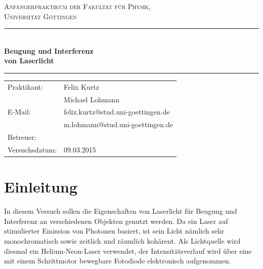 \documentclass[12pt,a4paper,titlepage,headinclude,bibtotoc]{scrartcl}
\begin{document}
\begin{titlepage}
\centering
\textsc{\Large Anfängerpraktikum der Fakultät für
  Physik,\\[1.5ex] Universität Göttingen}

\vspace*{4.2cm}

\rule{\textwidth}{1pt}\\[0.5cm]
{\huge \bfseries
  Beugung und Interferenz\\[1.5ex]
  von Laserlicht}\\[0.5cm]
\rule{\textwidth}{1pt}

\vspace*{3.0cm}

\begin{Large}
\begin{tabular}{ll}
Praktikant:
 	&  Felix Kurtz\\
 	&  Michael Lohmann\\

E-Mail: 
	&  felix.kurtz@stud.uni-goettingen.de\\
	& m.lohmann@stud.uni-goettingen.de\\

 Betreuer: & \\
 Versuchsdatum: &  09.03.2015\\
\end{tabular}
\end{Large}

\vspace*{0.8cm}

\begin{Large}
\end{Large}

\end{titlepage}

\tableofcontents

\newpage

\section{Einleitung}
\label{sec:einleitung}
In diesem Versuch sollen die Eigenschaften von Laserlicht für Beugung und Interferenz an verschiedenen Objekten genutzt werden.
Da ein Laser auf stimulierter Emission von Photonen basiert, ist sein Licht nämlich sehr monochromatisch sowie zeitlich und räumlich kohärent.
Als Lichtquelle wird diesmal ein Helium-Neon-Laser verwendet, der Intensitätsverlauf wird über eine mit einem Schrittmotor bewegbare Fotodiode elektronisch aufgenommen.
\end{document}
